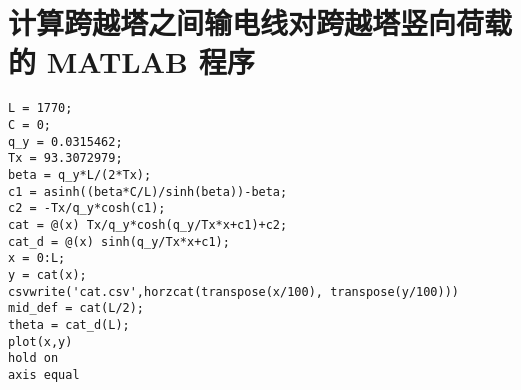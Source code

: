 \section{计算跨越塔之间输电线对跨越塔竖向荷载的 MATLAB 程序}
\begin{verbatim}
L = 1770;
C = 0;
q_y = 0.0315462;
Tx = 93.3072979;
beta = q_y*L/(2*Tx);
c1 = asinh((beta*C/L)/sinh(beta))-beta;
c2 = -Tx/q_y*cosh(c1);
cat = @(x) Tx/q_y*cosh(q_y/Tx*x+c1)+c2;
cat_d = @(x) sinh(q_y/Tx*x+c1);
x = 0:L;
y = cat(x);
csvwrite('cat.csv',horzcat(transpose(x/100), transpose(y/100)))
mid_def = cat(L/2);
theta = cat_d(L);
plot(x,y)
hold on
axis equal

\end{verbatim}